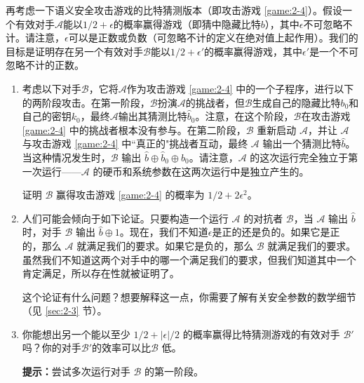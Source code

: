 \begin{exercise}[偏差校正]
再考虑一下语义安全攻击游戏的比特猜测版本（即攻击游戏 \ref{game:2-4}）。假设一个有效对手$\mathcal{A}$能以$1/2+\epsilon$的概率赢得游戏（即猜中隐藏比特$b$），其中$\epsilon$不可忽略不计。请注意，$\epsilon$可以是正数或负数（可忽略不计的定义在绝对值上起作用）。我们的目标是证明存在另一个有效对手$\mathcal{B}$能以$1/2+\epsilon'$的概率赢得游戏，其中$\epsilon'$是一个不可忽略不计的正数。
\begin{enumerate}[\indent(a)]
	\item 考虑以下对手$\mathcal{B}$，它将$\mathcal{A}$作为攻击游戏 \ref{game:2-4} 中的一个子程序，进行以下的两阶段攻击。在第一阶段，$\mathcal{B}$扮演$\mathcal{A}$的挑战者，但$\mathcal{B}$生成自己的隐藏比特$b_0$和自己的密钥$k_0$，最终$\mathcal{A}$输出其猜测比特$\hat b_0$。注意，在这个阶段，$\mathcal{B}$在攻击游戏 \ref{game:2-4} 中的挑战者根本没有参与。在第二阶段，$\mathcal{B}$ 重新启动 $\mathcal{A}$，并让 $\mathcal{A}$ 与攻击游戏 \ref{game:2-4} 中``真正的"挑战者互动，最终 $\mathcal{A}$ 输出一个猜测比特$\hat b$。当这种情况发生时，$\mathcal{B}$ 输出 $\hat{b}\oplus\hat{b}_0\oplus b_0$。请注意，$\mathcal{A}$ 的这次运行完全独立于第一次运行——$\mathcal{A}$ 的硬币和系统参数在这两次运行中是独立产生的。
	
	\vspace{1pt}
	
	证明 $\mathcal{B}$ 赢得攻击游戏 \ref{game:2-4} 的概率为 $1/2+2\epsilon^2$。
	\item 人们可能会倾向于如下论证。只要构造一个运行 $\mathcal{A}$ 的对抗者 $\mathcal{B}$，当 $\mathcal{A}$ 输出 $\hat b$ 时，对手 $\mathcal{B}$ 输出 $\hat{b}\oplus 1$。现在，我们不知道$\epsilon$是正的还是负的。如果它是正的，那么 $\mathcal{A}$ 就满足我们的要求。如果它是负的，那么 $\mathcal{B}$ 就满足我们的要求。虽然我们不知道这两个对手中的哪一个满足我们的要求，但我们知道其中一个肯定满足，所以存在性就被证明了。
	
	\vspace{1pt}
	
	这个论证有什么问题？想要解释这一点，你需要了解有关安全参数的数学细节（见 \ref{sec:2-3} 节）。
	\item 你能想出另一个能以至少 $1/2+|\epsilon|/2$ 的概率赢得比特猜测游戏的有效对手 $\mathcal{B}'$吗？你的对手$\mathcal{B}'$的效率可以比$\mathcal{B}$ 低。
	
	\vspace{1pt}

	\textbf{提示：}尝试多次运行对手 $\mathcal{B}$ 的第一阶段。
\end{enumerate}
\end{exercise}